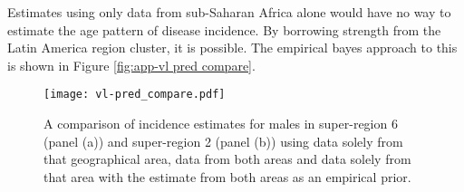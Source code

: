 Estimates using only data from sub-Saharan Africa alone would have no
way to estimate the age pattern of disease incidence. By borrowing
strength from the Latin America region cluster, it is possible.  The
empirical bayes approach to this is shown in Figure \ref{fig:app-vl
  pred compare}.

    \begin{figure}[h]
        \begin{center}
            \texttt{[image: vl-pred\_compare.pdf]}
            \caption{A comparison of incidence estimates for males in
              super-region 6 (panel (a)) and super-region 2 (panel
              (b)) using data solely from that geographical area, data
              from both areas and data solely from that area with the
              estimate from both areas as an empirical prior.}
            \label{fig:app-vl pred compare}
        \end{center}
    \end{figure}
